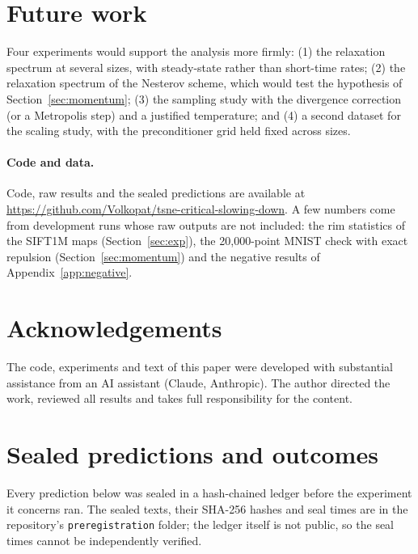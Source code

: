 \documentclass[11pt]{article}
\begin{document}
\section{Future work}\label{sec:status}
Four experiments would support the analysis more firmly: (1) the relaxation spectrum at several sizes, with
steady-state rather than short-time rates; (2) the relaxation spectrum of the Nesterov scheme, which would test the
hypothesis of Section~\ref{sec:momentum}; (3) the sampling study with the divergence correction (or a Metropolis step)
and a justified temperature; and (4) a second dataset for the scaling study, with the preconditioner grid held fixed
across sizes.

\paragraph{Code and data.} Code, raw results and the sealed predictions are available at
\url{https://github.com/Volkopat/tsne-critical-slowing-down}. A few numbers come from development runs whose raw
outputs are not included: the rim statistics of the SIFT1M maps (Section~\ref{sec:exp}), the 20{,}000-point MNIST
check with exact repulsion (Section~\ref{sec:momentum}) and the negative results of Appendix~\ref{app:negative}.

\section*{Acknowledgements}
The code, experiments and text of this paper were developed with substantial assistance from an AI assistant
(Claude, Anthropic). The author directed the work, reviewed all results and takes full responsibility for the
content.




\appendix
\section{Sealed predictions and outcomes}\label{app:sealed}
Every prediction below was sealed in a hash-chained ledger before the experiment it concerns ran. The sealed texts, their
SHA-256 hashes and seal times are in the repository's \texttt{preregistration} folder; the ledger itself is not
public, so the seal times cannot be independently verified.
\begin{table}[h]\centering\small

\caption{All sealed predictions behind this paper and their outcomes, including those that failed.}\label{tab:sealed}\end{table}
\end{document}
